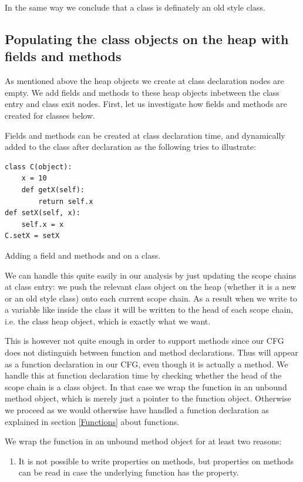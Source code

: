 In the same way we conclude that a class is definately an old style class.

\subsection{Populating the class objects on the heap with fields and methods}
As mentioned above the heap objects we create at class declaration nodes are empty. We add fields and methods to these heap objects inbetween the class entry and class exit nodes. First, let us investigate how fields and methods are created for classes below.

Fields and methods can be created at class declaration time, and dynamically added to the class after declaration as the following tries to illustrate:

\begin{listing}[H]
	\begin{verbatim}
class C(object):
	x = 10
	def getX(self):
		return self.x
def setX(self, x):
	self.x = x
C.setX = setX
	\end{verbatim}
	\caption{Adding a field  and methods  and  on a class.}\label{code:FieldAndMethodOnClass}
\end{listing}

We can handle this quite easily in our analysis by just updating the scope chains at class entry: we push the relevant class object on the heap (whether it is a new or an old style class) onto each current scope chain. As a result when we write to a variable like  inside the class it will be written to the head of each scope chain, i.e. the class heap object, which is exactly what we want.

This is however not quite enough in order to support methods since our CFG does not distinguish between function and method declarations. Thus  will appear as a function declaration in our CFG, even though it is actually a method. We handle this at function declaration time by checking whether the head of the scope chain is a class object. In that case we wrap the function in an unbound method object, which is merely just a pointer to the function object. Otherwise we proceed as we would otherwise have handled a function declaration as explained in section \ref{Functions} about functions.

We wrap the function in an unbound method object for at least two reasons:

\begin{enumerate}
	\item It is not possible to write properties on methods, but properties on methods can be read in case the underlying function has the property.
\end{enumerate}

